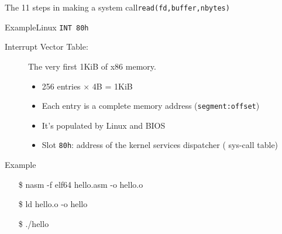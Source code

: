 \begin{frame}{The 11 steps in making a system call}{\texttt{read(fd,buffer,nbytes)}}
  \begin{center}
  \end{center}
\end{frame}

\begin{frame}{Example}{Linux \texttt{INT 80h}}
  \begin{description}
  \item[Interrupt Vector Table:] The very first 1KiB of x86 memory. 
    \begin{itemize} 
    \item 256 entries $\times$ 4B = 1KiB
    \item Each entry is a complete memory address (\texttt{segment:offset})
    \item It's populated by Linux and BIOS
    \item Slot \texttt{80h}: address of the kernel services dispatcher ({\pright} sys-call table)
    \end{itemize}
  \end{description}
\end{frame}

\begin{frame}{Example}
  \begin{center}
  \end{center}
  \begin{block}{}
    \ttfamily
    \begin{enumerate}
    \item[\$] nasm -f elf64 hello.asm -o hello.o
    \item[\$] ld hello.o -o hello
    \item[\$] ./hello
    \end{enumerate}
  \end{block}
\end{frame}

\begin{frame}%
  \begin{center}
  \end{center}
\end{frame}

